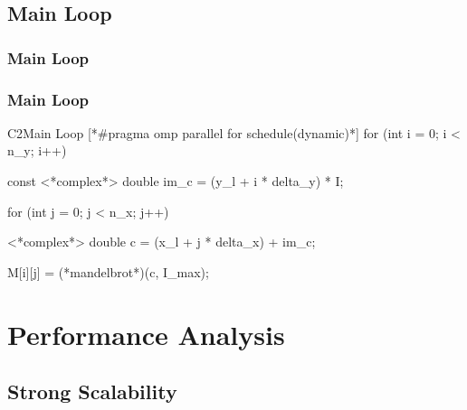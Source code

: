 \documentclass[xcolor=table]{beamer}
\begin{document}
\subsection{Main Loop}

\begin{frame}[t]
\frametitle{Main Loop}



\end{frame}

\begin{frame}[fragile]
\frametitle{Main Loop}


\begin{code}{C2}{Main Loop}{}{}
[*#pragma omp parallel for schedule(dynamic)*]
for (int i = 0; i < n_y; i++) {

	const <*complex*> double im_c = (y_l + i * delta_y) * I;

	for (int j = 0; j < n_x; j++) {

		<*complex*> double c = (x_l + j * delta_x) + im_c;

		M[i][j] = (*mandelbrot*)(c, I_max);

	}
}
\end{code}

\end{frame}
\section{Performance Analysis}

\subsection{Strong Scalability}
\end{document}

